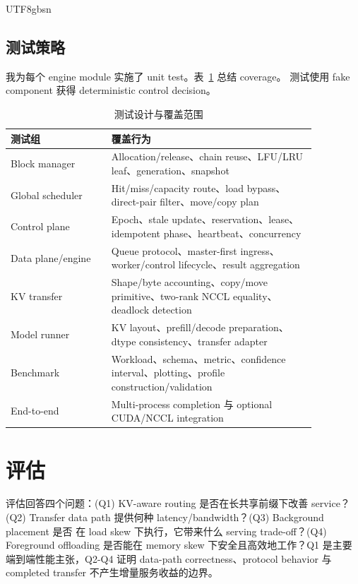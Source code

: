 \documentclass[11pt,a4paper]{article}
\begin{document}
\begin{CJK*}{UTF8}{gbsn}
\subsection{测试策略}

我为每个 engine module 实施了 unit test。表~\ref{tab:tests} 总结 coverage。
测试使用 fake component 获得 deterministic control decision。

\begin{table}[t]
\centering\caption{测试设计与覆盖范围}\label{tab:tests}\footnotesize
\setlength{\tabcolsep}{3.5pt}
\begin{tabular}{@{}p{0.28\linewidth}p{0.58\linewidth}@{}}\toprule
测试组 & 覆盖行为\\\midrule
Block manager & Allocation/release、chain reuse、LFU/LRU leaf、generation、snapshot\\
Global scheduler & Hit/miss/capacity route、load bypass、direct-pair filter、move/copy plan\\
Control plane & Epoch、stale update、reservation、lease、idempotent phase、heartbeat、concurrency\\
Data plane/engine & Queue protocol、master-first ingress、worker/control lifecycle、result aggregation\\
KV transfer & Shape/byte accounting、copy/move primitive、two-rank NCCL equality、deadlock detection\\
Model runner & KV layout、prefill/decode preparation、dtype consistency、transfer adapter\\
Benchmark & Workload、schema、metric、confidence interval、plotting、profile construction/validation\\
End-to-end & Multi-process completion 与 optional CUDA/NCCL integration\\\bottomrule
\end{tabular}\end{table}

\section{评估}

评估回答四个问题：(Q1) KV-aware routing 是否在长共享前缀下改善 service？
(Q2) Transfer data path 提供何种 latency/bandwidth？(Q3) Background placement 是否
在 load skew 下执行，它带来什么 serving trade-off？(Q4) Foreground offloading 是否能在 memory skew
下安全且高效地工作？Q1 是主要端到端性能主张，Q2-Q4 证明 data-path correctness、protocol
behavior 与 completed transfer 不产生增量服务收益的边界。


\end{CJK*}
\end{document}
